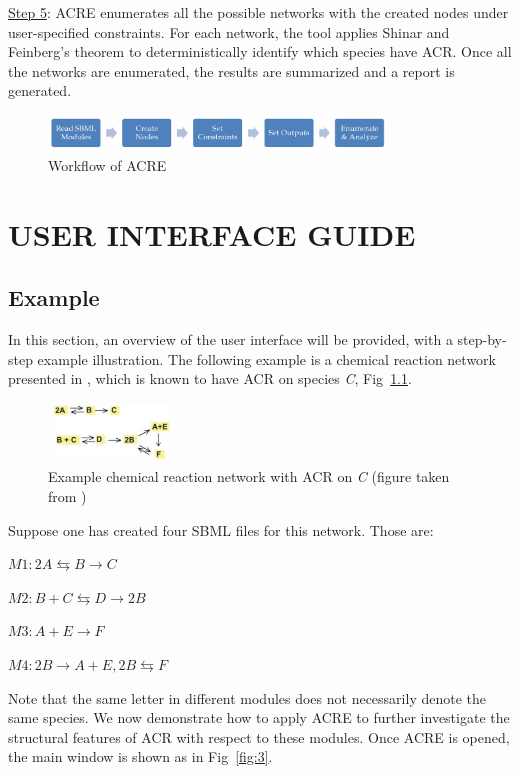 \documentclass{report}
\begin{document}
\underline{Step 5}: ACRE enumerates all the possible networks with the created nodes under user-specified
constraints. For each network, the tool applies Shinar and Feinberg's theorem to
deterministically identify which species have ACR. Once all the networks are enumerated, the
results are summarized and a report is generated.

\begin{figure}
	\centering
		\includegraphics[width=0.8\textwidth]{1}
	\caption{Workflow of ACRE}
	\label{fig:1}
\end{figure}
\vspace{-2cm}
\chapter{USER INTERFACE GUIDE}
\section{Example}
In this section, an overview of the user interface will be provided, with a step-by-step example
illustration. The following example is a chemical reaction network presented in \cite{c1}, which is
known to have ACR on species \textit{C}, Fig~\ref{fig:2}.

\begin{figure}
	\centering
		\includegraphics[width=0.3\textwidth]{2}
	\caption{Example chemical reaction network with ACR on \textit{C} (figure taken from \cite{c1})}
	\label{fig:2}
\end{figure}

Suppose one has created four SBML files for this network. Those are:

$M1: 2A \leftrightarrows  B \rightarrow C$

$M2: B + C \leftrightarrows  D \rightarrow 2B$

$M3: A + E \rightarrow F$

$M4: 2B \rightarrow A + E, 2B \leftrightarrows  F$

Note that the same letter in different modules does not necessarily denote the same species.
We now demonstrate how to apply ACRE to further investigate the structural features of ACR
with respect to these modules. Once ACRE is opened, the main window is shown as in Fig~\ref{fig:3}.
\end{document}
